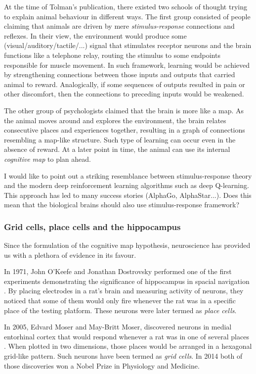 \documentclass[12pt]{article}
\begin{document}
At the time of Tolman's publication, there existed two schools of thought trying to explain animal behaviour in different ways. The first group consisted of people claiming that animals are driven by mere \textit{stimulus-response} connections and reflexes. In their view, the environment would produce some (visual/auditory/tactile/...) signal that stimulates receptor neurons and the brain functions like a telephone relay, routing the stimulus to some endpoints responsible for muscle movement. In such framework, learning would be achieved by strengthening connections between those inputs and outputs that carried animal to reward. Analogically, if some sequences of outputs resulted in pain or other discomfort, then the connections to preceding inputs would be weakened.

The other group of psychologists claimed that the brain is more like a map. As the animal moves around and explores the environment, the brain relates consecutive places and experiences together, resulting in a graph of  connections resembling a map-like structure. Such type of learning can occur even in the absence of reward. At a later point in time, the animal can use its internal \textit{cognitive map} to plan ahead. 

I would like to point out a striking resemblance between stimulus-response theory and the modern deep reinforcement learning algorithms such as deep Q-learning. This approach has led to many success stories (AlphaGo, AlphaStar...). Does this mean that the biological brains should also use stimulus-response framework?

\subsubsection{Grid cells, place cells and the hippocampus}
Since the formulation of the cognitive map hypothesis, neuroscience has provided us with a plethora of evidence in its favour.

In 1971, John O'Keefe and Jonathan Dostrovsky performed one of the first experiments demonstrating the significance of hippocampus in spacial navigation \cite{OKEEFE1971171}. By placing electrodes in a rat's brain and measuring activity of neurons, they noticed that some of them would only fire whenever the  rat was in a specific place of the testing platform. These neurons were later termed as \textit{place cells}.

In 2005, Edvard Moser and May-Britt Moser, discovered neurons in medial entorhinal cortex that would respond whenever a rat was in one of several places \cite{Hafting2005}. When plotted in two dimensions, those places would be arranged in a hexagonal grid-like pattern. Such neurons have been termed as \textit{grid cells}. In 2014 both of those discoveries won a Nobel Prize in Physiology and Medicine. 
\end{document}
